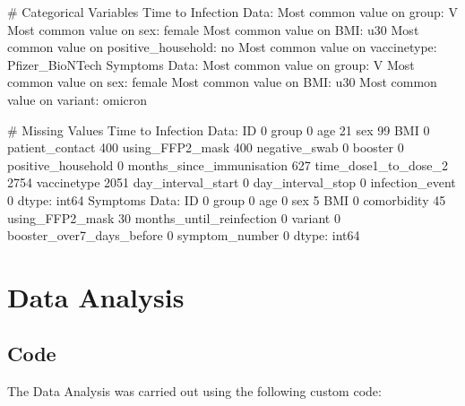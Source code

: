 \documentclass[11pt]{article}
\begin{document}
\begin{codeoutput}
\# Categorical Variables
Time to Infection Data:
Most common value on group: V
Most common value on sex: female
Most common value on BMI: u30
Most common value on positive\_household: no
Most common value on vaccinetype: Pfizer\_BioNTech
Symptoms Data:
Most common value on group: V
Most common value on sex: female
Most common value on BMI: u30
Most common value on variant: omicron

\# Missing Values
Time to Infection Data:
ID                              0
group                           0
age                            21
sex                            99
BMI                             0
patient\_contact               400
using\_FFP2\_mask               400
negative\_swab                   0
booster                         0
positive\_household              0
months\_since\_immunisation     627
time\_dose1\_to\_dose\_2         2754
vaccinetype                  2051
day\_interval\_start              0
day\_interval\_stop               0
infection\_event                 0
dtype: int64
Symptoms Data:
ID                            0
group                         0
age                           0
sex                           5
BMI                           0
comorbidity                  45
using\_FFP2\_mask              30
months\_until\_reinfection      0
variant                       0
booster\_over7\_days\_before     0
symptom\_number                0
dtype: int64
\end{codeoutput}

\section{Data Analysis}
\subsection{{Code}}
The Data Analysis was carried out using the following custom code:
\end{document}
